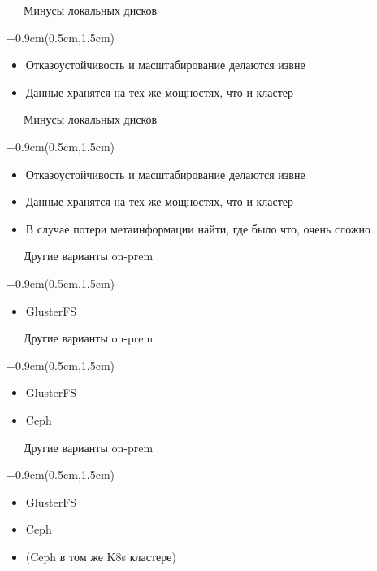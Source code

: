 \documentclass[xetex,18pt,aspectratio=43]{beamer}
\begin{document}
\begin{Large}
\begin{frame}{\ \ \ Минусы локальных дисков}
\begin{textblock*}{\framewidth+0.9cm}(0.5cm,1.5cm)
\begin{itemize}
  \item Отказоустойчивость и масштабирование делаются извне
  \item Данные хранятся на тех же мощностях, что и кластер
\end{itemize}
\end{textblock*}
\end{frame}

\begin{frame}{\ \ \ Минусы локальных дисков}
\begin{textblock*}{\framewidth+0.9cm}(0.5cm,1.5cm)
\begin{itemize}
  \item Отказоустойчивость и масштабирование делаются извне
  \item Данные хранятся на тех же мощностях, что и кластер
  \item В случае потери метаинформации найти, где было что, очень сложно
\end{itemize}
\end{textblock*}
\end{frame}

\begin{frame}{\ \ \ Другие варианты on-prem}
\begin{textblock*}{\framewidth+0.9cm}(0.5cm,1.5cm)
\begin{itemize}
  \item GlusterFS
\end{itemize}
\end{textblock*}
\end{frame}

\begin{frame}{\ \ \ Другие варианты on-prem}
\begin{textblock*}{\framewidth+0.9cm}(0.5cm,1.5cm)
\begin{itemize}
  \item GlusterFS
  \item Ceph
\end{itemize}
\end{textblock*}
\end{frame}

\begin{frame}{\ \ \ Другие варианты on-prem}
\begin{textblock*}{\framewidth+0.9cm}(0.5cm,1.5cm)
\begin{itemize}
  \item GlusterFS
  \item Ceph
  \item \href{https://rook.io}{\color{linkcolor}{rook.io}} (Ceph в
    том же K8s кластере)
\end{itemize}
\end{textblock*}
\end{frame}


\end{Large}
\end{document}
